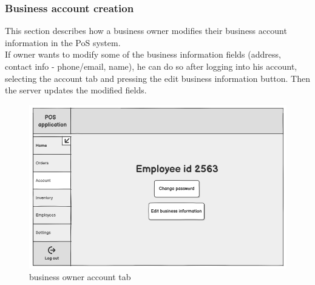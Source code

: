 \documentclass{article}
\begin{document}
    \subsubsection{Business account creation}
    This section describes how a business owner modifies their business account information in the PoS system.\\
     If owner wants to modify some of the business information fields (address, contact info - phone/email, name), he can do so after logging into his account, selecting the account tab and pressing the edit business information button. Then the server updates the modified fields.
    \begin{figure}[H]
        \centering
        \includegraphics[width=0.9\linewidth]{PSP/lab-1/mockups/account.png}
        \caption{business owner account tab}
        \label{}
    \end{figure}

     
\end{document}
